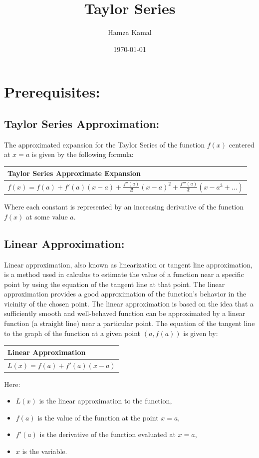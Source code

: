 \documentclass[12pt]{article}
\title{Taylor Series}
\author{Hamza Kamal}
\date{\today}
\newcommand{\formula}[2]{
    {\renewcommand{\arraystretch}{2}
        \begin{center}
        \begin{tabular}{|p{0.9\textwidth}|}
        \hline
        \textbf{#1} \\
        \hline
        #2 \\
        \hline
        \end{tabular}
        \end{center}
    }
}
\begin{document}
\setlength{\jot}{10pt}

\begin{titlepage}
\maketitle
\thispagestyle{empty}
\end{titlepage}

\tableofcontents
\newpage

\section{Prerequisites: }

\subsection{Taylor Series Approximation: }
The approximated expansion for the Taylor Series of the function $f(x)$ centered at $x=a$ is given by the following formula:
\formula{Taylor Series Approximate Expansion}{$f(x) = f(a) + f'(a)(x-a) + \frac{f''(a)}{2!}(x-a)^2 + \frac{f'''(a)}{3!}(x-a^3 + \ldots)$}
Where each constant is represented by an increasing derivative of the function $f(x)$ at some value $a$.

\subsection{Linear Approximation: }
Linear approximation, also known as linearization or tangent line approximation, is a method used in calculus to estimate the value of a function near a specific point by using the equation of the tangent line at that point. The linear approximation provides a good approximation of the function's behavior in the vicinity of the chosen point.
\vspace{\baselineskip}
The linear approximation is based on the idea that a sufficiently smooth and well-behaved function can be approximated by a linear function (a straight line) near a particular point. The equation of the tangent line to the graph of the function at a given point $(a, f(a))$ is given by:
\formula{Linear Approximation}{$L(x) = f(a) + f'(a)(x - a)$}
Here:
\begin{itemize}
  \item $L(x)$ is the linear approximation to the function,
  \item $f(a)$ is the value of the function at the point $x = a$,
  \item $f'(a)$ is the derivative of the function evaluated at $x = a$,
  \item $x$ is the variable.
\end{itemize}
\end{document}
